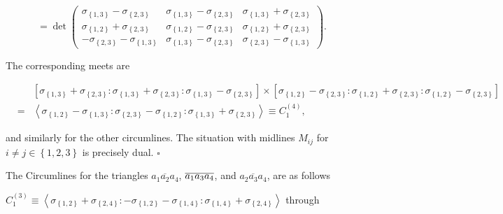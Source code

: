 \documentclass[11pt]{article}
\begin{document}
\begin{equation*}
=\det \left( 
\begin{array}{ccc}
\sigma _{\left\{ 1,3\right\} }-\sigma _{\left\{ 2,3\right\} } & \sigma
_{\left\{ 1,3\right\} }-\sigma _{\left\{ 2,3\right\} } & \sigma _{\left\{
1,3\right\} }+\sigma _{\left\{ 2,3\right\} } \\ 
\sigma _{\left\{ 1,2\right\} }+\sigma _{\left\{ 2,3\right\} } & \sigma
_{\left\{ 1,2\right\} }-\sigma _{\left\{ 2,3\right\} } & \sigma _{\left\{
1,2\right\} }+\sigma _{\left\{ 2,3\right\} } \\ 
-\sigma _{\left\{ 2,3\right\} }-\sigma _{\left\{ 1,3\right\} } & \sigma
_{\left\{ 1,3\right\} }-\sigma _{\left\{ 2,3\right\} } & \sigma _{\left\{
2,3\right\} }-\sigma _{\left\{ 1,3\right\} }%
\end{array}%
\right) .
\end{equation*}

The corresponding meets are

\begin{eqnarray*}
&&\left[ \sigma _{\left\{ 1,3\right\} }+\sigma _{\left\{ 2,3\right\}
}:\sigma _{\left\{ 1,3\right\} }+\sigma _{\left\{ 2,3\right\} }:\sigma
_{\left\{ 1,3\right\} }-\sigma _{\left\{ 2,3\right\} }\right] \times \left[
\sigma _{\left\{ 1,2\right\} }-\sigma _{\left\{ 2,3\right\} }:\sigma
_{\left\{ 1,2\right\} }+\sigma _{\left\{ 2,3\right\} }:\sigma _{\left\{
1,2\right\} }-\sigma _{\left\{ 2,3\right\} }\right]  \\
&=&\left\langle \sigma _{\left\{ 1,2\right\} }-\sigma _{\left\{ 1,3\right\}
}:\sigma _{\left\{ 2,3\right\} }-\sigma _{\left\{ 1,2\right\} }:\sigma
_{\left\{ 1,3\right\} }+\sigma _{\left\{ 2,3\right\} }\right\rangle \equiv
C_{1}^{\left( 4\right) },
\end{eqnarray*}

and similarly for the other circumlines. The situation with midlines $M_{ij}$
for $i\neq j\in \left\{ 1,2,3\right\} $ is precisely dual. $\square $

\bigskip

The Circumlines for the triangles $\overline{a_{1}a_{2}a_{4}}$, $\overline{%
a_{1}a_{3}a_{4}}$, and $\overline{a_{2}a_{3}a_{4}}$, are as follows

$C_{1}^{\left( 3\right) }\equiv \left\langle \sigma _{\left\{ 1,2\right\}
}+\sigma _{\left\{ 2,4\right\} }:-\sigma _{\left\{ 1,2\right\} }-\sigma
_{\left\{ 1,4\right\} }:\sigma _{\left\{ 1,4\right\} }+\sigma _{\left\{
2,4\right\} }\right\rangle $ through
\end{document}
